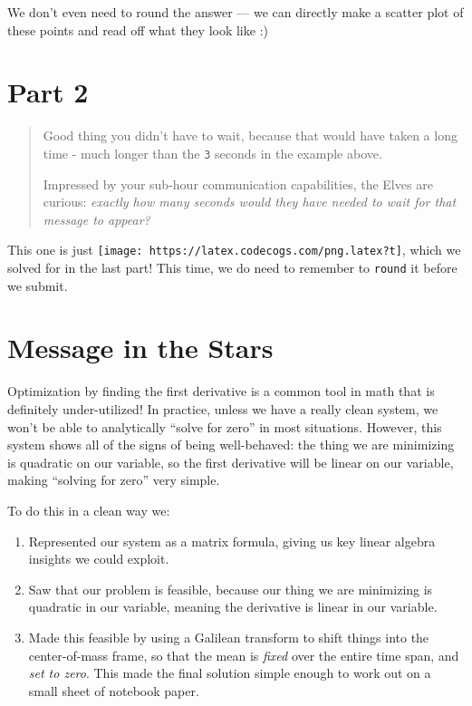 \documentclass[]{article}
\begin{document}
We don't even need to round the answer --- we can directly make a scatter plot
of these points and read off what they look like :)

\hypertarget{part-2}{%
\section{Part 2}\label{part-2}}

\begin{quote}
Good thing you didn't have to wait, because that would have taken a long time -
much longer than the \texttt{3} seconds in the example above.

Impressed by your sub-hour communication capabilities, the Elves are curious:
\emph{exactly how many seconds would they have needed to wait for that message
to appear?}
\end{quote}

This one is just \texttt{[image: https://latex.codecogs.com/png.latex?t]}, which
we solved for in the last part! This time, we do need to remember to
\texttt{round} it before we submit.

\hypertarget{message-in-the-stars}{%
\section{Message in the Stars}\label{message-in-the-stars}}

Optimization by finding the first derivative is a common tool in math that is
definitely under-utilized! In practice, unless we have a really clean system, we
won't be able to analytically ``solve for zero'' in most situations. However,
this system shows all of the signs of being well-behaved: the thing we are
minimizing is quadratic on our variable, so the first derivative will be linear
on our variable, making ``solving for zero'' very simple.

To do this in a clean way we:

\begin{enumerate}
\def\labelenumi{\arabic{enumi}.}
\tightlist
\item
  Represented our system as a matrix formula, giving us key linear algebra
  insights we could exploit.
\item
  Saw that our problem is feasible, because our thing we are minimizing is
  quadratic in our variable, meaning the derivative is linear in our variable.
\item
  Made this feasible by using a Galilean transform to shift things into the
  center-of-mass frame, so that the mean is \emph{fixed} over the entire time
  span, and \emph{set to zero}. This made the final solution simple enough to
  work out on a small sheet of notebook paper.
\end{enumerate}
\end{document}
